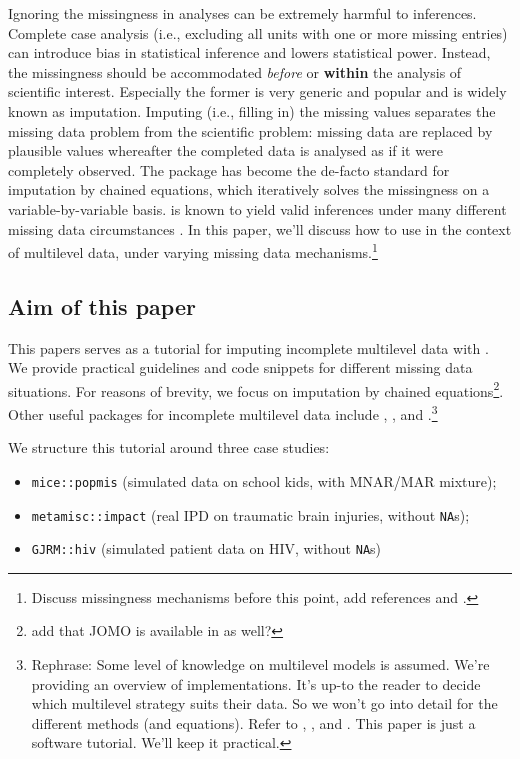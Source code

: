 \documentclass[
]{jss}
\begin{document}
Ignoring the missingness in analyses can be extremely harmful to
inferences. Complete case analysis (i.e., excluding all units with one
or more missing entries) can introduce bias in statistical inference and
lowers statistical power. Instead, the missingness should be
accommodated \emph{before} or \textbf{within} the analysis of scientific
interest. Especially the former is very generic and popular and is
widely known as imputation. Imputing (i.e., filling in) the missing
values separates the missing data problem from the scientific problem:
missing data are replaced by plausible values whereafter the completed
data is analysed as if it were completely observed. The 
package  has become the de-facto standard for imputation by
chained equations, which iteratively solves the missingness on a
variable-by-variable basis.  is known to yield valid
inferences under many different missing data circumstances
\citep{buur18}. In this paper, we'll discuss how to use  in
the context of multilevel data, under varying missing data
mechanisms.\footnote{Discuss missingness mechanisms before this point,
  add references \citet{yuce08} and \citet{hox15}.}

\hypertarget{aim-of-this-paper}{%
\subsection{Aim of this paper}\label{aim-of-this-paper}}

This papers serves as a tutorial for imputing incomplete multilevel data
with . We provide practical guidelines and code snippets for
different missing data situations. For reasons of brevity, we focus on
imputation by chained equations\footnote{add that JOMO is available in
   as well?}. Other useful packages for incomplete multilevel
data include , , and .\footnote{Rephrase:
  Some level of knowledge on multilevel models is assumed. We're
  providing an overview of implementations. It's up-to the reader to
  decide which multilevel strategy suits their data. So we won't go into
  detail for the different methods (and equations). Refer to
  \citet{meng94}, \citet{audi18}, and \citet{grun18}. This paper is just
  a software tutorial. We'll keep it practical.}

We structure this tutorial around three case studies:

\begin{itemize}
\item
  \texttt{mice::popmis} (simulated data on school kids, with MNAR/MAR
  mixture);
\item
  \texttt{metamisc::impact} (real IPD on traumatic brain injuries,
  without \texttt{NA}s);
\item
  \texttt{GJRM::hiv} (simulated patient data on HIV, without
  \texttt{NA}s)
\end{itemize}
\end{document}
